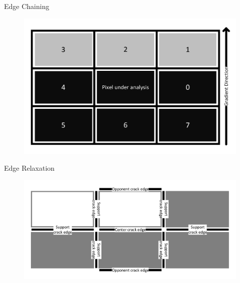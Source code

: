 \begin{frame}[fragile]{\insertsection}{Edge Chaining}
\begin{figure}[ht]
\includegraphics[scale=0.4]{pictures/Simon/chain_mask}
\centering
\end{figure}
\end{frame}

\begin{frame}[fragile]{\insertsection}{Edge Relaxation}
\begin{figure}[ht]
\includegraphics[scale=0.45]{pictures/Simon/crack_edges}
\centering
\end{figure}
\end{frame}

